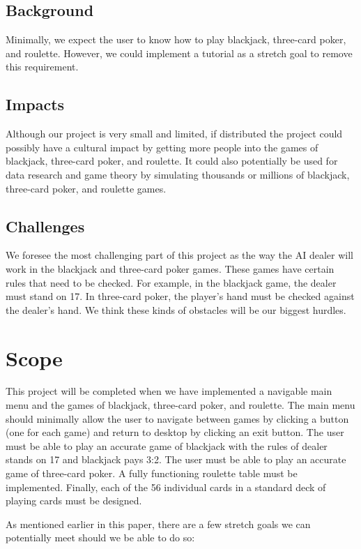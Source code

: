 \documentclass[10pt,conference,onecolumn,compsoc]{IEEEtran}
\begin{document}
\subsection{Background}
Minimally, we expect the user to know how to play blackjack, three-card poker, and roulette. However, we could implement a tutorial as a stretch goal to remove this requirement.

\subsection{Impacts}
Although our project is very small and limited, if distributed the project could possibly have a cultural impact by getting more people into the games of blackjack, three-card poker, and roulette. It could also potentially be used for data research and game theory by simulating thousands or millions of blackjack, three-card poker, and roulette games.

\subsection{Challenges}
We foresee the most challenging part of this project as the way the AI dealer will work in the blackjack and three-card poker games. These games have certain rules that need to be checked. For example, in the blackjack game, the dealer must stand on 17. In three-card poker, the player's hand must be checked against the dealer's hand. We think these kinds of obstacles will be our biggest hurdles.


\section{Scope}
This project will be completed when we have implemented a navigable main menu and the games of blackjack, three-card poker, and roulette. The main menu should minimally allow the user to navigate between games by clicking a button (one for each game) and return to desktop by clicking an exit button. The user must be able to play an accurate game of blackjack with the rules of dealer stands on 17 and blackjack pays 3:2. The user must be able to play an accurate game of three-card poker. A fully functioning roulette table must be implemented. Finally, each of the 56 individual cards in a standard deck of playing cards must be designed.


As mentioned earlier in this paper, there are a few stretch goals we can potentially meet should we be able to do so:\\
\end{document}
